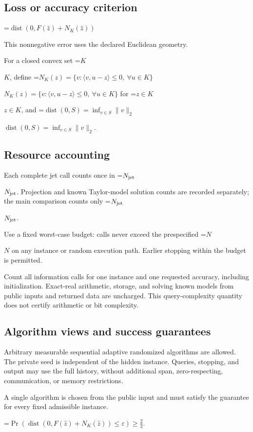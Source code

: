 \documentclass[10pt,a4paper]{article}
\newcommand{\AtlasMath}[1]{\par\begingroup\centering\setbox0=\hbox{$\displaystyle #1$}\ifdim\wd0>1.4\linewidth\typeout{ATLAS WIDE FORMULA: \the\wd0}\fi\ifdim\wd0>\linewidth\resizebox{\linewidth}{!}{\box0}\else\box0\fi\par\endgroup}
\newcommand{\AtlasInlineMath}[1]{\begingroup\setbox0=\hbox{$#1$}\ifdim\wd0>.4\linewidth\endgroup\AtlasMath{#1}\else\endgroup$#1$\fi}
\begin{document}
\subsection{Loss or accuracy criterion}

\AtlasMath{\operatorname{dist}(0,F(\widehat{z})+N_K(\widehat{z}))}


This nonnegative error uses the declared Euclidean geometry.

For a closed convex set \AtlasInlineMath{K}, define \AtlasInlineMath{N_K(z)=\{v:\langle v,u-z\rangle\le0,\ \forall u\in K\}} for \AtlasInlineMath{z\in K}, and \AtlasInlineMath{\operatorname{dist}(0,S)=\inf_{v\in S}\|v\|_2}.

\subsection{Resource accounting}
Each complete jet call counts once in \AtlasInlineMath{N_{\rm jet}}. Projection and known Taylor-model solution counts are recorded separately; the main comparison counts only \AtlasInlineMath{N_{\rm jet}}.

Use a fixed worst-case budget: calls never exceed the prespecified \AtlasInlineMath{N} on any instance or random execution path. Earlier stopping within the budget is permitted.

Count all information calls for one instance and one requested accuracy, including initialization. Exact-real arithmetic, storage, and solving known models from public inputs and returned data are uncharged. This query-complexity quantity does not certify arithmetic or bit complexity.

\subsection{Algorithm views and success guarantees}
Arbitrary measurable sequential adaptive randomized algorithms are allowed. The private seed is independent of the hidden instance. Queries, stopping, and output may use the full history, without additional span, zero-respecting, communication, or memory restrictions.

A single algorithm is chosen from the public input and must satisfy the guarantee for every fixed admissible instance.


\AtlasMath{\Pr\!\left(\operatorname{dist}(0,F(\widehat{z})+N_K(\widehat{z}))\le\varepsilon\right)\ge\frac23.}
\end{document}
